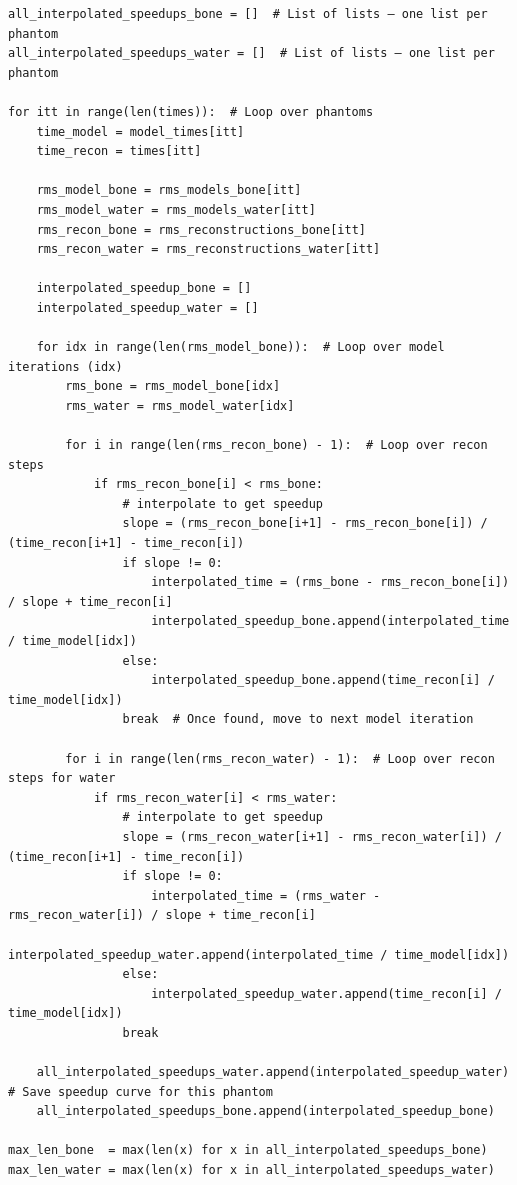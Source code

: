 \begin{verbatim}
all_interpolated_speedups_bone = []  # List of lists — one list per phantom
all_interpolated_speedups_water = []  # List of lists — one list per phantom

for itt in range(len(times)):  # Loop over phantoms
    time_model = model_times[itt]
    time_recon = times[itt]

    rms_model_bone = rms_models_bone[itt]
    rms_model_water = rms_models_water[itt]
    rms_recon_bone = rms_reconstructions_bone[itt]
    rms_recon_water = rms_reconstructions_water[itt]

    interpolated_speedup_bone = []
    interpolated_speedup_water = []

    for idx in range(len(rms_model_bone)):  # Loop over model iterations (idx)
        rms_bone = rms_model_bone[idx]
        rms_water = rms_model_water[idx]

        for i in range(len(rms_recon_bone) - 1):  # Loop over recon steps
            if rms_recon_bone[i] < rms_bone:
                # interpolate to get speedup
                slope = (rms_recon_bone[i+1] - rms_recon_bone[i]) / (time_recon[i+1] - time_recon[i])
                if slope != 0:
                    interpolated_time = (rms_bone - rms_recon_bone[i]) / slope + time_recon[i]
                    interpolated_speedup_bone.append(interpolated_time / time_model[idx])
                else:
                    interpolated_speedup_bone.append(time_recon[i] / time_model[idx])
                break  # Once found, move to next model iteration
        
        for i in range(len(rms_recon_water) - 1):  # Loop over recon steps for water
            if rms_recon_water[i] < rms_water:
                # interpolate to get speedup
                slope = (rms_recon_water[i+1] - rms_recon_water[i]) / (time_recon[i+1] - time_recon[i])
                if slope != 0:
                    interpolated_time = (rms_water - rms_recon_water[i]) / slope + time_recon[i]
                    interpolated_speedup_water.append(interpolated_time / time_model[idx])
                else:
                    interpolated_speedup_water.append(time_recon[i] / time_model[idx])
                break
    
    all_interpolated_speedups_water.append(interpolated_speedup_water)  # Save speedup curve for this phantom
    all_interpolated_speedups_bone.append(interpolated_speedup_bone)

max_len_bone  = max(len(x) for x in all_interpolated_speedups_bone)
max_len_water = max(len(x) for x in all_interpolated_speedups_water)


\end{verbatim}
